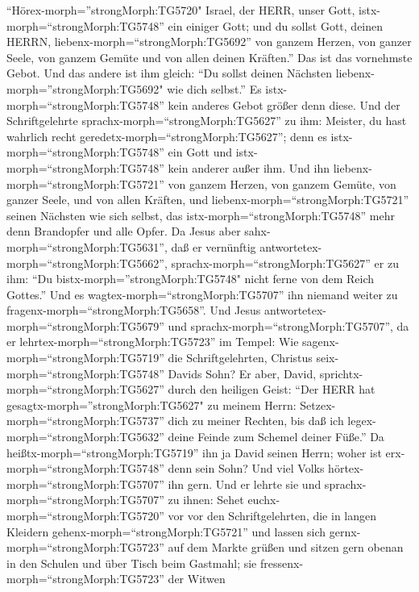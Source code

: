 ``Hörex-morph=''strongMorph:TG5720" Israel, der HERR, unser Gott,
istx-morph=``strongMorph:TG5748'' ein einiger Gott;  und du
sollst Gott, deinen HERRN, liebenx-morph=``strongMorph:TG5692'' von
ganzem Herzen, von ganzer Seele, von ganzem Gemüte und von allen deinen
Kräften.'' Das ist das vornehmste Gebot.  Und das andere
ist ihm gleich: ``Du sollst deinen Nächsten
liebenx-morph=''strongMorph:TG5692" wie dich selbst.'' Es
istx-morph=``strongMorph:TG5748'' kein anderes Gebot größer denn diese.
 Und der Schriftgelehrte
sprachx-morph=``strongMorph:TG5627'' zu ihm: Meister, du hast wahrlich
recht geredetx-morph=``strongMorph:TG5627''; denn es
istx-morph=``strongMorph:TG5748'' ein Gott und
istx-morph=``strongMorph:TG5748'' kein anderer außer ihm. 
Und ihn liebenx-morph=``strongMorph:TG5721'' von ganzem Herzen, von
ganzem Gemüte, von ganzer Seele, und von allen Kräften, und
liebenx-morph=``strongMorph:TG5721'' seinen Nächsten wie sich selbst,
das istx-morph=``strongMorph:TG5748'' mehr denn Brandopfer und alle
Opfer.  Da Jesus aber sahx-morph=``strongMorph:TG5631'',
daß er vernünftig antwortetex-morph=``strongMorph:TG5662'',
sprachx-morph=``strongMorph:TG5627'' er zu ihm: ``Du
bistx-morph=''strongMorph:TG5748" nicht ferne von dem Reich Gottes.''
Und es wagtex-morph=``strongMorph:TG5707'' ihn niemand weiter zu
fragenx-morph=``strongMorph:TG5658''.  Und Jesus
antwortetex-morph=``strongMorph:TG5679'' und
sprachx-morph=``strongMorph:TG5707'', da er
lehrtex-morph=``strongMorph:TG5723'' im Tempel: Wie
sagenx-morph=``strongMorph:TG5719'' die Schriftgelehrten, Christus
seix-morph=``strongMorph:TG5748'' Davids Sohn?  Er aber,
David, sprichtx-morph=``strongMorph:TG5627'' durch den heiligen Geist:
``Der HERR hat gesagtx-morph=''strongMorph:TG5627" zu meinem Herrn:
Setzex-morph=``strongMorph:TG5737'' dich zu meiner Rechten, bis daß ich
legex-morph=``strongMorph:TG5632'' deine Feinde zum Schemel deiner
Füße.''  Da heißtx-morph=``strongMorph:TG5719'' ihn ja
David seinen Herrn; woher ist erx-morph=``strongMorph:TG5748'' denn sein
Sohn? Und viel Volks hörtex-morph=``strongMorph:TG5707'' ihn gern.
 Und er lehrte sie und sprachx-morph=``strongMorph:TG5707''
zu ihnen: Sehet euchx-morph=``strongMorph:TG5720'' vor vor den
Schriftgelehrten, die in langen Kleidern
gehenx-morph=``strongMorph:TG5721'' und lassen sich
gernx-morph=``strongMorph:TG5723'' auf dem Markte grüßen 
und sitzen gern obenan in den Schulen und über Tisch beim Gastmahl;
 sie fressenx-morph=``strongMorph:TG5723'' der Witwen
